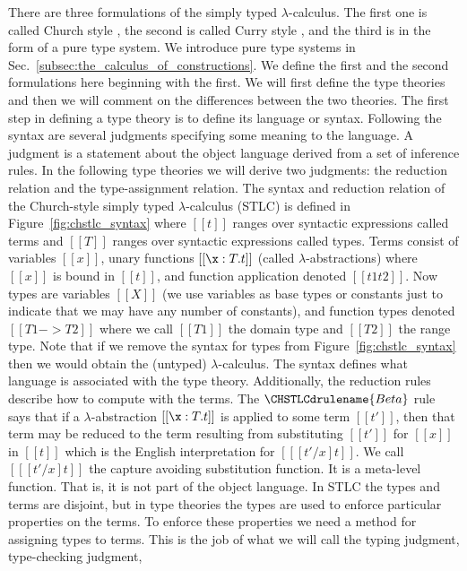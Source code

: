 There are three formulations of the simply typed $\lambda$-calculus.
The first one is called Church style
\cite{Girard:1989,Barendregt:1992,Church:1940}, the second is called
Curry style \cite{Barendregt:1992,Reynolds:1998}, and the third is in
the form of a pure type system.  We introduce pure type systems in
Sec.~\ref{subsec:the_calculus_of_constructions}.  We define the first
and the second formulations here beginning with the first.  We will
first define the type theories and then we will comment on the
differences between the two theories.  The first step in defining a
type theory is to define its language or syntax.  Following the syntax
are several judgments specifying some meaning to the language.  A
judgment is a statement about the object language derived from a set
of inference rules.  In the following type theories we will derive two
judgments: the reduction relation and the type-assignment relation.
The syntax and reduction relation of the Church-style simply typed
$\lambda$-calculus (STLC) is defined in
Figure~\ref{fig:chstlc_syntax} where $[[t]]$ ranges over syntactic expressions
called terms and $[[T]]$ ranges over syntactic expressions called types. Terms consist of
variables $[[x]]$, unary functions $[[\x:T.t]]$ (called $\lambda$-abstractions) where $[[x]]$ is bound
in $[[t]]$, and function application denoted $[[t1 t2]]$.  Now types
are variables $[[X]]$ (we use variables as base types or constants
just to indicate that we may have any number of constants), 
and function types denoted $[[T1 -> T2]]$ where we call
$[[T1]]$ the domain type and $[[T2]]$ the range type.  Note that if we
remove the syntax for types from Figure~\ref{fig:chstlc_syntax} then
we would obtain the (untyped) $\lambda$-calculus.  The syntax defines
what language is associated with the type theory.  Additionally, the
reduction rules describe how to compute with the terms.  The
$\CHSTLCdrulename{Beta}$ rule says that if a $\lambda$-abstraction $[[\x:T.t]]$ is applied
to some term $[[t']]$, then that term may be reduced to the term resulting from substituting $[[t']]$ for $[[x]]$ in
$[[t]]$ which is the English interpretation for $[[ [t'/x]t]]$. We call
$[[ [t'/x] t]]$ the capture avoiding substitution function. It is a
meta-level function. That is, it is not part of the object language. In STLC
the types and terms are disjoint, but in type theories the types are
used to enforce particular properties on the terms.  To enforce these
properties we need a method for assigning types to terms.  This is the
job of what we will call the typing judgment, type-checking judgment,
